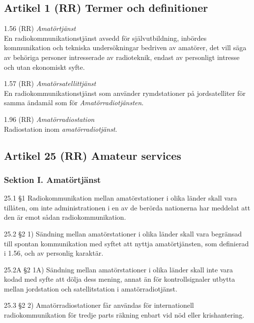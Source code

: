 \subsection{Artikel 1 (RR) Termer och definitioner}
\label{amatörradio definitioner}

1.56 (RR) \emph{Amatörtjänst}~\cite[1.56]{ITU-RR}\\
En radiokommunikationstjänst avsedd för självutbildning, inbördes
kommunikation och tekniska undersökningar bedriven av amatörer, det
vill säga av behöriga personer intresserade av radioteknik,
endast av personligt intresse och utan ekonomiskt syfte.

1.57 (RR) \emph{Amatörsatellittjänst}~\cite[1.57]{ITU-RR}\\
En radiokommunikationstjänst som använder rymdstationer på
jordsatelliter för samma ändamål som för \emph{Amatörradiotjänsten}.

1.96 (RR) \emph{Amatörradiostation}~\cite[1.96]{ITU-RR}\\
Radiostation inom \emph{amatörradiotjänst}.

\subsection{Artikel 25 (RR) Amateur services}

\subsubsection{Sektion I. Amatörtjänst}
25.1 \S1 Radiokommunikation mellan amatörstationer i olika länder
skall vara tillåten, om inte administrationen i en av de berörda
nationerna har meddelat att den är emot sådan radiokommunikation.
\cite[25.1]{ITU-RR}

25.2 \S2 1) Sändning mellan amatörstationer i olika länder skall vara
begränsad till spontan kommunikation med syftet att nyttja amatörtjänsten,
som definierad i 1.56, och av personlig karaktär.
\cite[25.2]{ITU-RR}

25.2A \S2 1A) Sändning mellan amatörstationer i olika länder skall
inte vara kodad med syfte att dölja dess mening, annat än för kontrollsignaler
utbytta mellan jordstation och satellitstation i amatörradiotjänst.
\cite[25.2A]{ITU-RR}

25.3 \S2 2) Amatörradiostationer får användas för internationell
radiokommunikation för tredje parts räkning enbart vid nöd eller
krishantering.
\cite[25.3]{ITU-RR}

